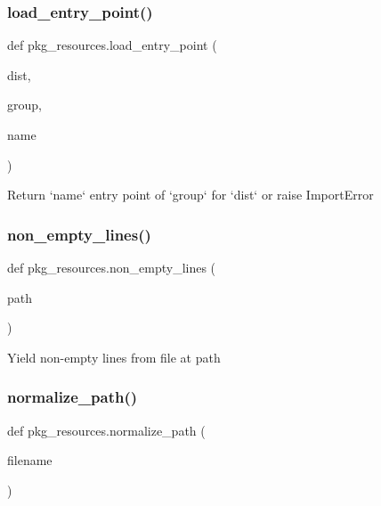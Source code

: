 \mbox{\label{namespacepkg__resources_a2bc38c681dc970a15ff89f47bedd624a}} 
\subsubsection{\texorpdfstring{load\+\_\+entry\+\_\+point()}{load\_entry\_point()}}
{\footnotesize\ttfamily def pkg\+\_\+resources.\+load\+\_\+entry\+\_\+point (\begin{DoxyParamCaption}\item[{}]{dist,  }\item[{}]{group,  }\item[{}]{name }\end{DoxyParamCaption})}

\begin{DoxyVerb}Return `name` entry point of `group` for `dist` or raise ImportError\end{DoxyVerb}
 \mbox{\label{namespacepkg__resources_aebf9bba27fbad2388790590cac11be48}} 
\subsubsection{\texorpdfstring{non\+\_\+empty\+\_\+lines()}{non\_empty\_lines()}}
{\footnotesize\ttfamily def pkg\+\_\+resources.\+non\+\_\+empty\+\_\+lines (\begin{DoxyParamCaption}\item[{}]{path }\end{DoxyParamCaption})}

\begin{DoxyVerb}Yield non-empty lines from file at path
\end{DoxyVerb}
 \mbox{\label{namespacepkg__resources_a92fefe633fcea7303e233a72b5cb023b}} 
\subsubsection{\texorpdfstring{normalize\+\_\+path()}{normalize\_path()}}
{\footnotesize\ttfamily def pkg\+\_\+resources.\+normalize\+\_\+path (\begin{DoxyParamCaption}\item[{}]{filename }\end{DoxyParamCaption})}

